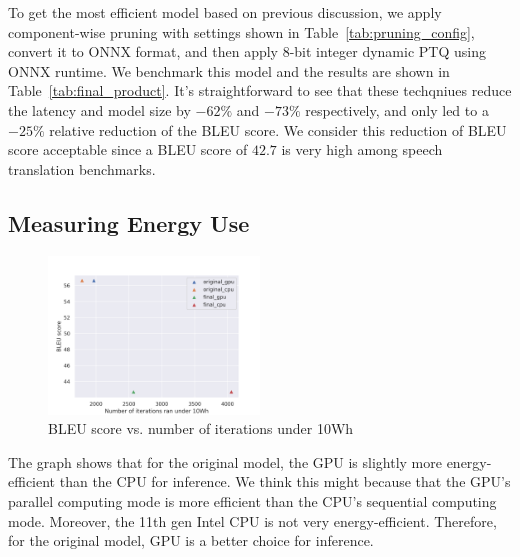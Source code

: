\documentclass[11pt]{article}
\begin{document}
To get the most efficient model based on previous discussion, we apply component-wise pruning with settings shown in Table~\ref{tab:pruning_config}, convert it to ONNX format, and then apply 8-bit integer dynamic PTQ using ONNX runtime.
We benchmark this model and the results are shown in Table~\ref{tab:final_product}.
It's straightforward to see that these techqniues reduce the latency and model size by $-62\%$ and $-73\%$ respectively, and only led to a $-25\%$ relative reduction of the BLEU score.
We consider this reduction of BLEU score acceptable since a BLEU score of $42.7$ is very high among speech translation benchmarks.


\subsection{Measuring Energy Use}

\begin{figure}[h!]
    \centering
    \includegraphics[width=0.5\textwidth]{images/under_10Wh.png}
    \caption{BLEU score vs. number of iterations under 10Wh}
    \label{fig:under_budget}
\end{figure}

The graph shows that for the original model, the GPU is slightly more energy-efficient than the CPU for inference. We think this might because that the GPU’s parallel computing mode is more efficient than the CPU’s sequential computing mode. Moreover, the 11th gen Intel CPU is not very energy-efficient. Therefore, for the original model, GPU is a better choice for inference.
\end{document}
